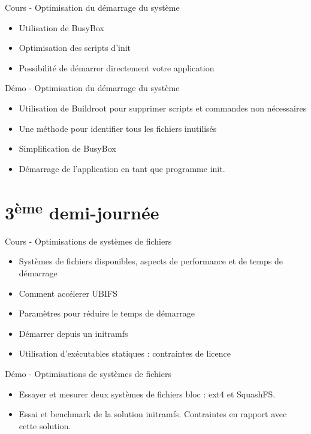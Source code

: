 \documentclass[a4paper,12pt,obeyspaces,spaces,hyphens]{article}
\begin{document}
\feagendatwocolumn
{Cours - Optimisation du démarrage du système}
{
  \begin{itemize}
  \item Utilisation de BusyBox 
  \item Optimisation des scripts d'init
  \item Possibilité de démarrer directement votre application
  \end{itemize}
}
{Démo - Optimisation du démarrage du système}
{
 \begin{itemize}
 \item Utilisation de Buildroot pour supprimer scripts et commandes non nécessaires
 \item Une méthode pour identifier tous les fichiers inutilisés
 \item Simplification de BusyBox
 \item Démarrage de l'application en tant que programme init.
 \end{itemize}
}

\section{3\textsuperscript{ème} demi-journée}

\feagendatwocolumn
{Cours - Optimisations de systèmes de fichiers}
{
  \begin{itemize}
  \item Systèmes de fichiers disponibles, aspects de performance et de temps de démarrage
  \item Comment accélerer UBIFS
  \item Paramètres pour réduire le temps de démarrage
  \item Démarrer depuis un initramfs
  \item Utilisation d'exécutables statiques : contraintes de licence
  \end{itemize}
}
{Démo - Optimisations de systèmes de fichiers}
{
 \begin{itemize}
 \item Essayer et mesurer deux systèmes de fichiers bloc : ext4 et SquashFS.
 \item Essai et benchmark de la solution initramfs. Contraintes
       en rapport avec cette solution.
 \end{itemize}
}
\end{document}
